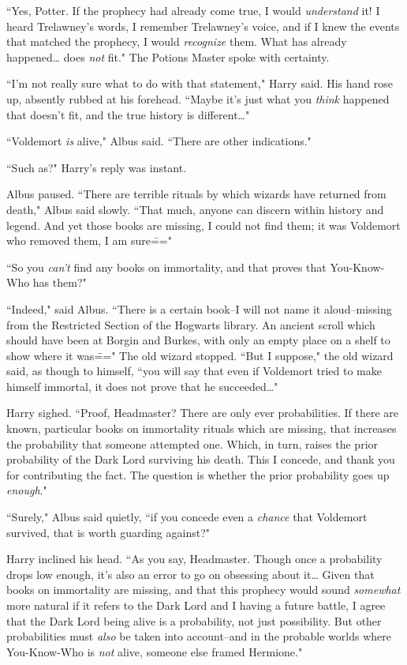 ``Yes, Potter. If the prophecy had already come true, I would \emph{understand} it! I heard Trelawney's words, I remember Trelawney's voice, and if I knew the events that matched the prophecy, I would \emph{recognize} them. What has already happened{\ldots} does \emph{not} fit." The Potions Master spoke with certainty.

``I'm not really sure what to do with that statement," Harry said. His hand rose up, absently rubbed at his forehead. ``Maybe it's just what you \emph{think} happened that doesn't fit, and the true history is different{\ldots}"

``Voldemort \emph{is} alive," Albus said. ``There are other indications."

``Such as?" Harry's reply was instant.

Albus paused. ``There are terrible rituals by which wizards have returned from death," Albus said slowly. ``That much, anyone can discern within history and legend. And yet those books are missing, I could not find them; it was Voldemort who removed them, I am sure\==="

``So you \emph{can't} find any books on immortality, and that proves that You-Know-Who has them?"

``Indeed," said Albus. ``There is a certain book\---I will not name it aloud\---missing from the Restricted Section of the Hogwarts library. An ancient scroll which should have been at Borgin and Burkes, with only an empty place on a shelf to show where it was\===" The old wizard stopped. ``But I suppose," the old wizard said, as though to himself, ``you will say that even if Voldemort tried to make himself immortal, it does not prove that he succeeded{\ldots}"

Harry sighed. ``Proof, Headmaster? There are only ever probabilities. If there are known, particular books on immortality rituals which are missing, that increases the probability that someone attempted one. Which, in turn, raises the prior probability of the Dark Lord surviving his death. This I concede, and thank you for contributing the fact. The question is whether the prior probability goes up \emph{enough}."

``Surely," Albus said quietly, ``if you concede even a \emph{chance} that Voldemort survived, that is worth guarding against?"

Harry inclined his head. ``As you say, Headmaster. Though once a probability drops low enough, it's also an error to go on obsessing about it{\ldots} Given that books on immortality are missing, and that this prophecy would sound \emph{somewhat} more natural if it refers to the Dark Lord and I having a future battle, I agree that the Dark Lord being alive is a probability, not just possibility. But other probabilities must \emph{also} be taken into account\---and in the probable worlds where You-Know-Who is \emph{not} alive, someone else framed Hermione."

